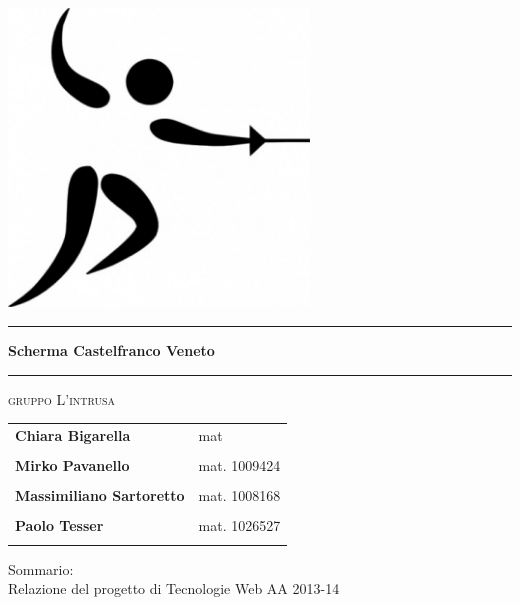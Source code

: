 \begin{titlepage}
 \begin{center}
     \includegraphics[width=8cm]{images/page_logo.png}\\
     
     \vspace{3em} \hrule \vspace{2em}
     {\LARGE \LARGE \LARGE \textbf{Scherma Castelfranco Veneto}}\\
     \vspace{2em} \hrule \vspace{2em}
     \vspace{2em}
 \end{center}

\begin{center}
	{\LARGE { \scshape gruppo L'intrusa}}\\
	\vspace{2em}
    \begin{tabular}{ R{5cm} | L{5cm}  }
    \textbf{Chiara Bigarella} & mat \\ \\
    \textbf{Mirko Pavanello} & mat. 1009424 \\ \\
    \textbf{Massimiliano Sartoretto} & mat. 1008168 \\ \\
    \textbf{Paolo Tesser} &  mat. 1026527 \\ \\
    \end{tabular}
\end{center}

\vskip 0.7cm
\begin{center}
Sommario: \\Relazione del progetto di Tecnologie Web AA 2013-14\\
\end{center}
\end{titlepage}
\newpage
